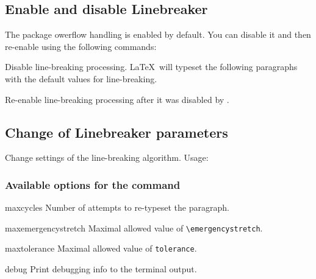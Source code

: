 \documentclass{l3doc}
\begin{document}
\subsection{Enable and disable Linebreaker}

The package owerflow handling is enabled by default. You can disable it and then re-enable using the following commands:

\begin{function}{\linebreakerdisable}
Disable line-breaking processing. \LaTeX\ will typeset the following paragraphs with the default values for line-breaking.
\end{function}

\begin{function}{\linebreakerenable}
Re-enable line-breaking processing after it was disabled by \cmd{\linebreakerdisable}.
\end{function}

\subsection{Change of Linebreaker parameters}

\begin{function}{\linebreakersetup}
  Change settings of the line-breaking algorithm.
  Usage: \cmd{\linebreakersetup}


\end{function}

\subsubsection{Available options for the \cmd{\linebreakersetup} command}

\begin{function}{maxcycles}
Number of attempts to re-typeset the paragraph.
\end{function}

\begin{function}{maxemergencystretch}
Maximal allowed value of \verb|\emergencystretch|.
\end{function}

\begin{function}{maxtolerance}
Maximal allowed value of \verb|tolerance|.
\end{function}

\begin{function}{debug}
Print debugging info to the terminal output.
\end{function}
\end{document}
